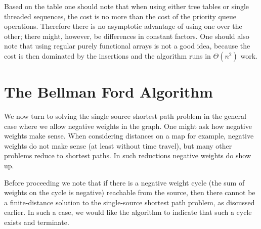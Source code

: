Based on the table one should note that when using either tree tables
or single threaded sequences, the cost is no more than the cost of the
priority queue operations.  Therefore there is no asymptotic advantage
of using one over the other; there might, however, be differences in
constant factors.  One should also note that using regular purely
functional arrays is not a good idea, because the cost is then
dominated by the insertions and the algorithm runs in $\Theta(n^2)$
work.





\section{The Bellman Ford Algorithm}

We now turn to solving the single source shortest path problem in the
general case where we allow negative weights in the graph.  One might
ask how negative weights make sense.  When considering distances on a
map for example, negative weights do not make sense (at least without
time travel), but many other problems reduce to shortest paths. In
such reductions negative weights do show up.

Before proceeding we note that if there is a negative weight cycle
(the sum of weights on the cycle is negative) reachable from the
source, then there cannot be a finite-distance solution to the
single-source shortest path problem, as discussed earlier.
%
In such a case, we would like the algorithm to indicate that such a
cycle exists and terminate.

